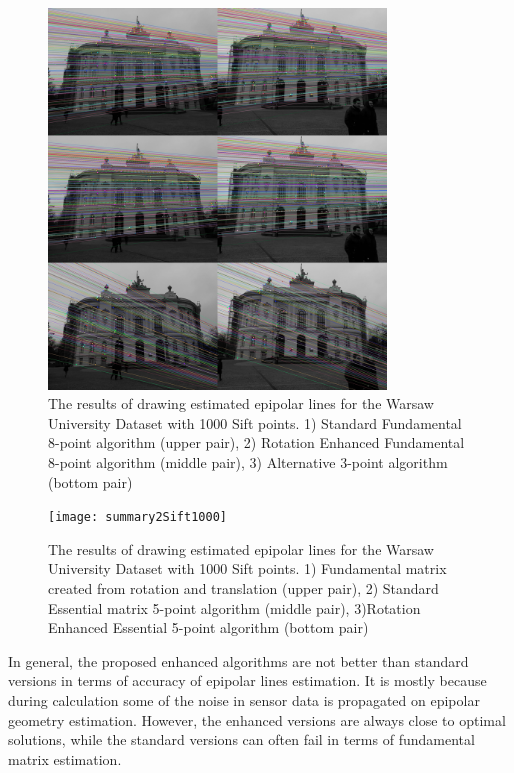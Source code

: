 \begin{figure}[b!]
    \centering
    \includegraphics[width=0.8\textwidth]{summary1Sift1000}
    \caption[The results of drawing estimated epipolar lines for the Warsaw University Dataset with 1000 Sift points (1st group)]{The results of drawing estimated epipolar lines for the Warsaw University Dataset with 1000 Sift points. 1) Standard Fundamental 8-point algorithm (upper pair), 2) Rotation Enhanced Fundamental 8-point algorithm (middle pair), 3) Alternative 3-point algorithm (bottom pair) }
    \label{fig:SummaryEpiLines11000}
\end{figure}
\begin{figure}[ht!]
    \centering
    \texttt{[image: summary2Sift1000]}
    \caption[The results of drawing estimated epipolar lines for the Warsaw University Dataset with 1000 Sift points (2nd group)]{The results of drawing estimated epipolar lines for the Warsaw University Dataset with 1000 Sift points. 1) Fundamental matrix created from rotation and translation (upper pair), 2) Standard Essential matrix 5-point algorithm (middle pair), 3)Rotation Enhanced Essential 5-point algorithm (bottom pair) }
    \label{fig:SummaryEpiLines21000}
\end{figure}
In general, the proposed enhanced algorithms are not better than standard versions in terms of accuracy of epipolar lines estimation. It is mostly because during calculation some of the noise in sensor data is propagated on epipolar geometry estimation. However, the enhanced versions are always close to optimal solutions, while the standard versions can often fail in terms of fundamental matrix estimation.
\clearpage

